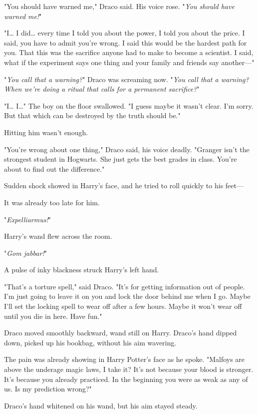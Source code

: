 "You should have warned me," Draco said. His voice rose. "\emph{You should have 
warned me!}"

"I{\ldots} I did{\ldots} every time I told you about the power, I told you 
about the price. I said, you have to admit you're wrong. I said this would be 
the hardest path for you. That this was the sacrifice anyone had to make to 
become a scientist. I said, what if the experiment says one thing and your 
family and friends say another---"

"\emph{You call that a warning?}" Draco was screaming now. "\emph{You call that 
a warning? When we're doing a ritual that calls for a permanent sacrifice?}"

"I{\ldots} I{\ldots}" The boy on the floor swallowed. "I guess maybe it wasn't 
clear. I'm sorry. But that which can be destroyed by the truth should be."

Hitting him wasn't enough.

"You're wrong about one thing," Draco said, his voice deadly. "Granger isn't 
the strongest student in Hogwarts. She just gets the best grades in class. 
You're about to find out the difference."

Sudden shock showed in Harry's face, and he tried to roll quickly to his feet---

It was already too late for him.

"\emph{Expelliarmus!}"

Harry's wand flew across the room.

"\emph{Gom jabbar!}"

A pulse of inky blackness struck Harry's left hand.

"That's a torture spell," said Draco. "It's for getting information out of 
people. I'm just going to leave it on you and lock the door behind me when I 
go. Maybe I'll set the locking spell to wear off after a few hours. Maybe it 
won't wear off until you die in here. Have fun."

Draco moved smoothly backward, wand still on Harry. Draco's hand dipped down, 
picked up his bookbag, without his aim wavering.

The pain was already showing in Harry Potter's face as he spoke. "Malfoys are 
above the underage magic laws, I take it? It's not because your blood is 
stronger. It's because you already practiced. In the beginning you were as weak 
as any of us. Is my prediction wrong?"

Draco's hand whitened on his wand, but his aim stayed steady.


